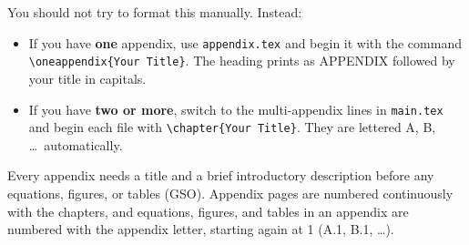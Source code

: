 You should not try to format this manually. Instead:
\begin{itemize}
\item If you have \textbf{one} appendix, use \texttt{appendix.tex} and begin it with the command \verb+\oneappendix{Your Title}+. The heading prints as APPENDIX followed by your title in capitals.
\item If you have \textbf{two or more}, switch to the multi-appendix lines in \texttt{main.tex} and begin each file with \verb+\chapter{Your Title}+. They are lettered A, B, \ldots\ automatically.
\end{itemize}

Every appendix needs a title and a brief introductory description before any equations, figures, or tables (GSO). Appendix pages are numbered continuously with the chapters, and equations, figures, and tables in an appendix are numbered with the appendix letter, starting again at 1 (A.1, B.1, \ldots).
